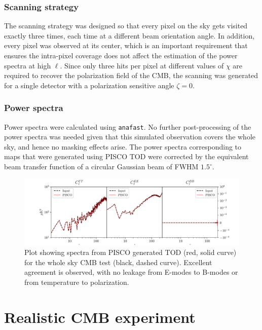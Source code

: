 \documentclass[a4paper,11pt]{article}
\begin{document}
\subsubsection{Scanning strategy}

The scanning strategy was designed so that every pixel on the sky gets visited exactly three times, each time at a different beam orientation angle. In addition, every pixel was observed at its center, which is an important requirement that ensures the intra-pixel coverage does not affect the estimation of the power spectra at high $\ell$. Since only three hits per pixel at different values of $\chi$ are required to recover the polarization field of the CMB, the scanning was generated for a single detector with a polarization sensitive angle $\zeta=0$.

\subsubsection{Power spectra}


Power spectra were calculated using \texttt{anafast}. No further post-processing of the power spectra was needed given that this simulated observation covers the whole sky, and hence no masking effects arise. The power spectra corresponding to maps that were generated using PISCO TOD were corrected by the equivalent beam transfer function of a circular Gaussian beam of FWHM $1.5^\circ$. 

\begin{figure}
	\centering
	\includegraphics[width=1\linewidth]{figures/cmb_r0d00_CLASS_wholeskytest.pdf}
	\caption{Plot showing spectra from PISCO generated TOD (red, solid curve) for the whole sky CMB test (black, dashed curve). Excellent agreement is observed, with no leakage from E-modes to B-modes or from temperature to polarization. }
	\label{fig::pisco4wholesky}
\end{figure}

%
\section{Realistic CMB experiment}
\label{sec::realistic_cmb_experiment}
\end{document}
